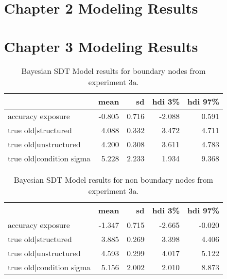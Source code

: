\chapter{Chapter 2 Modeling Results}

\chapter{Chapter 3 Modeling Results}

\begin{table}
    \centering
    \label{tab:exp3-bayesmodel-boundary-sdt}
    \caption{Bayesian SDT Model results for boundary nodes from experiment 3a. }
    \begin{tabular}{lrrrr}
        \toprule
         & mean & sd & hdi 3\% & hdi 97\% \\
        \midrule
        accuracy exposure & -0.805 & 0.716 & -2.088 & 0.591 \\
        true old|structured & 4.088 & 0.332 & 3.472 & 4.711 \\
        true old|unstructured & 4.200 & 0.308 & 3.611 & 4.783 \\
        true old|condition sigma & 5.228 & 2.233 & 1.934 & 9.368 \\
        \bottomrule
        \end{tabular}        
\end{table}

\begin{table}
    \centering
    \label{tab:exp3-bayesmodel-nonboundary-sdt}
    \caption{Bayesian SDT Model results for non boundary nodes from experiment 3a. }
    \begin{tabular}{lrrrr}
        \toprule
         & mean & sd & hdi 3\% & hdi 97\% \\
        \midrule
        accuracy exposure & -1.347 & 0.715 & -2.665 & -0.020 \\
        true old|structured & 3.885 & 0.269 & 3.398 & 4.406 \\
        true old|unstructured & 4.593 & 0.299 & 4.017 & 5.122 \\
        true old|condition sigma & 5.156 & 2.002 & 2.010 & 8.873 \\
        \bottomrule
        \end{tabular}
        
\end{table}

